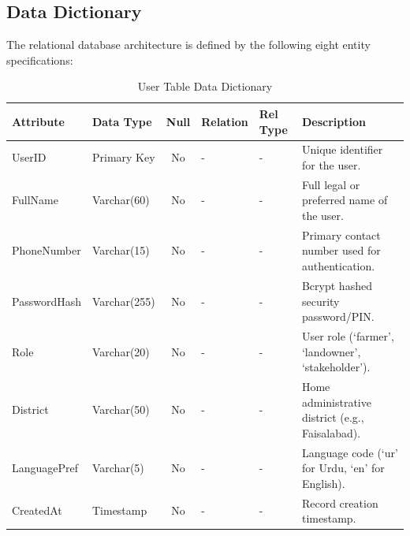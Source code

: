 \documentclass{FastFyp}
\begin{document}
\subsection{Data Dictionary}
The relational database architecture is defined by the following eight entity specifications:

\begin{table}[H]
\footnotesize
\centering
\caption{User Table Data Dictionary}
\label{tab:user_table}
\begin{tabular}{|l|l|c|l|l|p{4.5cm}|}
\hline
\textbf{Attribute} & \textbf{Data Type} & \textbf{Null} & \textbf{Relation} & \textbf{Rel Type} & \textbf{Description} \\ \hline
UserID & Primary Key & No & - & - & Unique identifier for the user. \\ \hline
FullName & Varchar(60) & No & - & - & Full legal or preferred name of the user. \\ \hline
PhoneNumber & Varchar(15) & No & - & - & Primary contact number used for authentication. \\ \hline
PasswordHash & Varchar(255) & No & - & - & Bcrypt hashed security password/PIN. \\ \hline
Role & Varchar(20) & No & - & - & User role (`farmer', `landowner', `stakeholder'). \\ \hline
District & Varchar(50) & No & - & - & Home administrative district (e.g., Faisalabad). \\ \hline
LanguagePref & Varchar(5) & No & - & - & Language code (`ur' for Urdu, `en' for English). \\ \hline
CreatedAt & Timestamp & No & - & - & Record creation timestamp. \\ \hline
\end{tabular}
\end{table}
\end{document}
